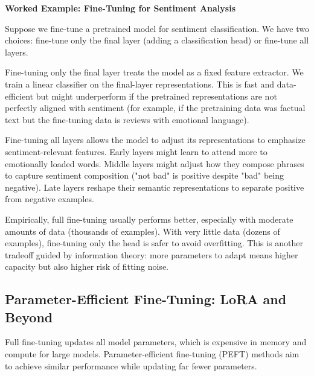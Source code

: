 \vspace{1.5em}

\begin{examplebox}
\textbf{Worked Example: Fine-Tuning for Sentiment Analysis}

Suppose we fine-tune a pretrained model for sentiment classification. We have two choices: fine-tune only the final layer (adding a classification head) or fine-tune all layers.

\vspace{0.5em}

Fine-tuning only the final layer treats the model as a fixed feature extractor. We train a linear classifier on the final-layer representations. This is fast and data-efficient but might underperform if the pretrained representations are not perfectly aligned with sentiment (for example, if the pretraining data was factual text but the fine-tuning data is reviews with emotional language).

\vspace{0.5em}

Fine-tuning all layers allows the model to adjust its representations to emphasize sentiment-relevant features. Early layers might learn to attend more to emotionally loaded words. Middle layers might adjust how they compose phrases to capture sentiment composition ("not bad" is positive despite "bad" being negative). Late layers reshape their semantic representations to separate positive from negative examples.

\vspace{0.5em}

Empirically, full fine-tuning usually performs better, especially with moderate amounts of data (thousands of examples). With very little data (dozens of examples), fine-tuning only the head is safer to avoid overfitting. This is another tradeoff guided by information theory: more parameters to adapt means higher capacity but also higher risk of fitting noise.
\end{examplebox}

\vspace{1.5em}


\vspace{1.5em}

\subsection{Parameter-Efficient Fine-Tuning: LoRA and Beyond}

Full fine-tuning updates all model parameters, which is expensive in memory and compute for large models. Parameter-efficient fine-tuning (PEFT) methods aim to achieve similar performance while updating far fewer parameters.

